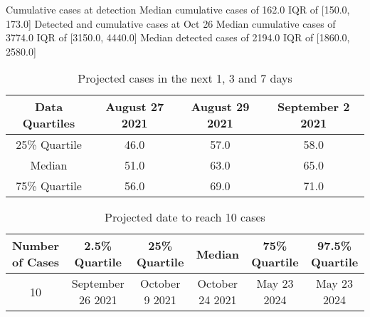 Cumulative cases at detection
Median cumulative cases of 162.0
IQR of [150.0, 173.0]
Detected and cumulative cases at Oct 26
Median cumulative cases of 3774.0
IQR of [3150.0, 4440.0]
Median detected cases of 2194.0
IQR of [1860.0, 2580.0]

\begin{table}[h] 
 \centering 
 \begin{tabular}{c|c|c|c}
Data Quartiles & August 27 2021 & August 29 2021 & September 2 2021\\
\hline
25\% Quartile & 46.0 & 57.0 & 58.0\\
Median & 51.0 & 63.0 & 65.0\\
75\% Quartile & 56.0 & 69.0 & 71.0\\
\end{tabular}
\caption{Projected cases in the next 1, 3 and 7 days}
\label{tab:BP_predicted_cases}
\end{table}

\begin{table}[h] 
 \centering 
 \begin{tabular}{c|c|c|c|c|c}
Number of Cases & 2.5\% Quartile & 25\% Quartile & Median & 75\% Quartile & 97.5\% Quartile \\
\hline
10 & September 26 2021 & October 9 2021 & October 24 2021 & May 23 2024 & May 23 2024\\
\end{tabular}
\caption{Projected date to reach 10 cases}
\label{tab:BP_date_to_reach_cases}
\end{table}
